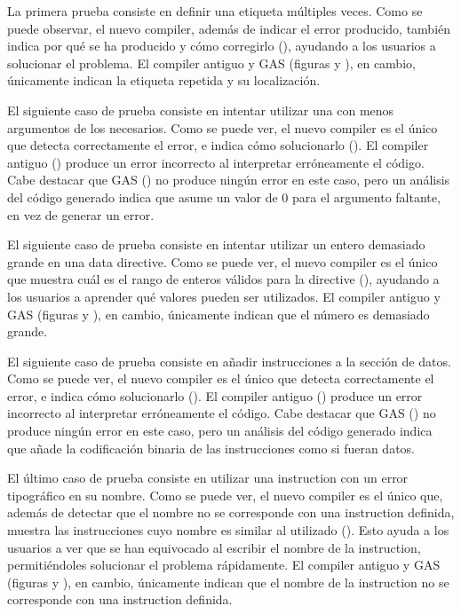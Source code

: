 La primera prueba consiste en definir una etiqueta múltiples veces. \evalresref
Como se puede observar, el nuevo \gls{compiler}, además de indicar el error
producido, también indica por qué se ha producido y cómo corregirlo
(), ayudando a los usuarios a solucionar el problema. El
\gls{compiler} antiguo y \gls{GAS} (figuras  y ), en
cambio, únicamente indican la etiqueta repetida y su localización.

\evalres

El siguiente caso de prueba consiste en intentar utilizar una
 con menos argumentos de los necesarios.
\evalresref Como se puede ver, el nuevo \gls{compiler} es el único que detecta
correctamente el error, e indica cómo solucionarlo (). El
\gls{compiler} antiguo () produce un error incorrecto al
interpretar erróneamente el código. Cabe destacar que \gls{GAS}
() no produce ningún error en este caso, pero un análisis del
código generado indica que asume un valor de 0 para el argumento faltante, en
vez de generar un error.

\evalres

El siguiente caso de prueba consiste en intentar utilizar un entero demasiado
grande en una \gls{data directive}. \evalresref Como se puede ver, el nuevo
\gls{compiler} es el único que muestra cuál es el rango de enteros válidos para
la \gls{directive} (), ayudando a los usuarios a aprender qué
valores pueden ser utilizados. El \gls{compiler} antiguo y \gls{GAS} (figuras
 y ), en cambio, únicamente indican que el número es
demasiado grande.

\evalres

El siguiente caso de prueba consiste en añadir instrucciones a la sección de
datos. \evalresref Como se puede ver, el nuevo \gls{compiler} es el único que
detecta correctamente el error, e indica cómo solucionarlo ().
El \gls{compiler} antiguo () produce un error incorrecto al
interpretar erróneamente el código. Cabe destacar que \gls{GAS}
() no produce ningún error en este caso, pero un análisis del
código generado indica que añade la codificación binaria de las instrucciones
como si fueran datos.

\evalres

El último caso de prueba consiste en utilizar una \gls{instruction} con un error
tipográfico en su nombre. \evalresref Como se puede ver, el nuevo \gls{compiler}
es el único que, además de detectar que el nombre no se corresponde con una
\gls{instruction} definida, muestra las instrucciones cuyo nombre es similar al
utilizado (). Esto ayuda a los usuarios a ver que se han
equivocado al escribir el nombre de la \gls{instruction}, permitiéndoles
solucionar el problema rápidamente. El \gls{compiler} antiguo y \gls{GAS}
(figuras  y ), en cambio, únicamente indican que el
nombre de la \gls{instruction} no se corresponde con una \gls{instruction}
definida.

